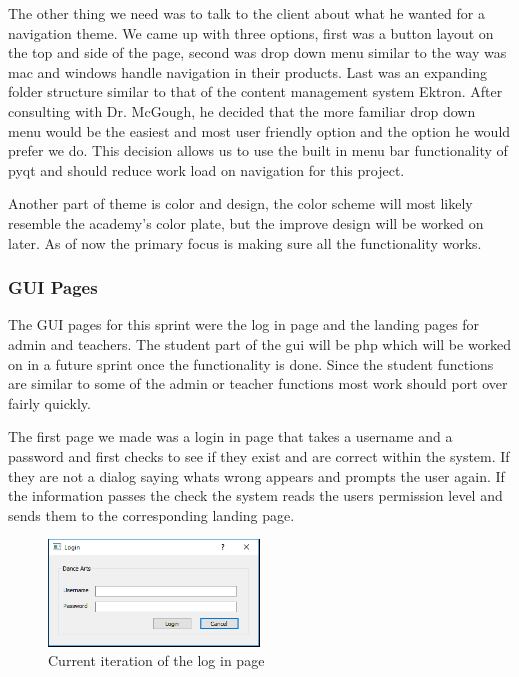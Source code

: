 The other thing we need was to talk to the client about what he wanted for a navigation theme. We came up with three options, first was a button layout on the top and side of the page, second was  drop down menu similar to the way was mac and windows handle navigation in their products. Last was an expanding folder structure similar to that of the content management system Ektron. After consulting with Dr. McGough, he  decided that the more familiar drop down menu would be the easiest and most user friendly option and the option he would prefer we do. This decision allows us to use the built in menu bar functionality of pyqt and should reduce work load on navigation for this project.

Another part of theme is color and design, the color scheme will most likely resemble the academy's color plate, but the improve design will be worked on later. As of now the primary focus is making sure all the functionality works.


\subsubsection{GUI Pages}

The GUI pages for this sprint were the log in page and the landing pages for admin and teachers. The student part of the gui will be php which will be worked on in a future sprint once the functionality is done. Since the student functions are similar to some of the admin or teacher functions most work should port over fairly quickly.

The first page we made was a login in page that takes a username and a password and first checks to see if they exist and are correct within the system. If they are not a dialog saying whats wrong appears and prompts the user again. If the information passes the check the system reads the users permission level and sends them to the corresponding landing page.

\begin{figure}
\caption{Current iteration of the log in page}
\centering
\includegraphics[width=0.5\textwidth]{login_page}
\end{figure}

